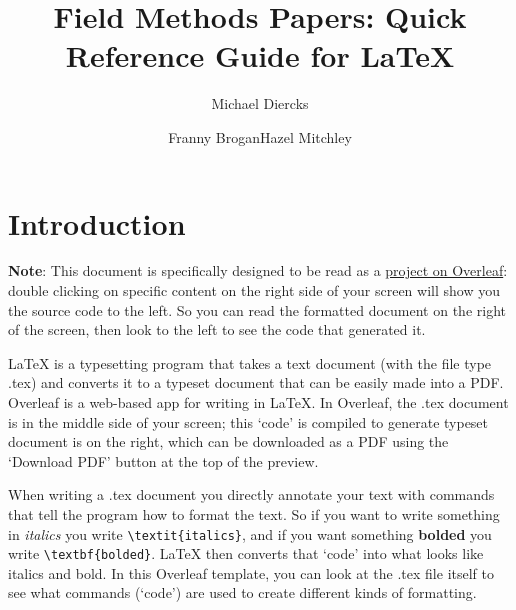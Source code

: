 \documentclass[output=paper,colorlinks,citecolor=brown]{langscibook}
\author{Michael Diercks\affiliation{Pomona College}\and Franny Brogan\affiliation{Pomona College}\lastand  Hazel Mitchley\affiliation{Rutgers University}}
\title{Field Methods Papers: Quick Reference Guide for LaTeX}
\begin{document}
\maketitle


\section{Introduction}


\textbf{Note}: This document is specifically designed to be read as a \href{https://www.overleaf.com/latex/templates/field-methods-papers-quick-reference-guide/cqbjxwnffvrm}{project on Overleaf}: double clicking on specific content on the right side of your screen will show you the source code to the left. So you can read the formatted document on the right of the screen, then look to the left to see the code that generated it.

\LaTeX{} is a typesetting program that takes a text document (with the file type .tex) and converts it to a typeset document that can be easily made into a PDF. Overleaf is a web-based app for writing in \LaTeX{}. In Overleaf, the .tex document is in the middle side of your screen; this `code' is compiled to generate typeset document is on the right, which can be downloaded as a PDF using the `Download PDF' button  at the top of the preview.

When writing a .tex document you directly annotate your text with commands that tell the program how to format the text. So if you want to write something in \textit{italics} you write \verb|\textit{italics}|, and if you want something \textbf{bolded} you write \verb|\textbf{bolded}|. \LaTeX{} then converts that `code' into what looks like italics and bold. In this Overleaf template, you can look at the .tex file itself to see what commands (`code') are used to create different kinds of formatting. 

\end{document}
